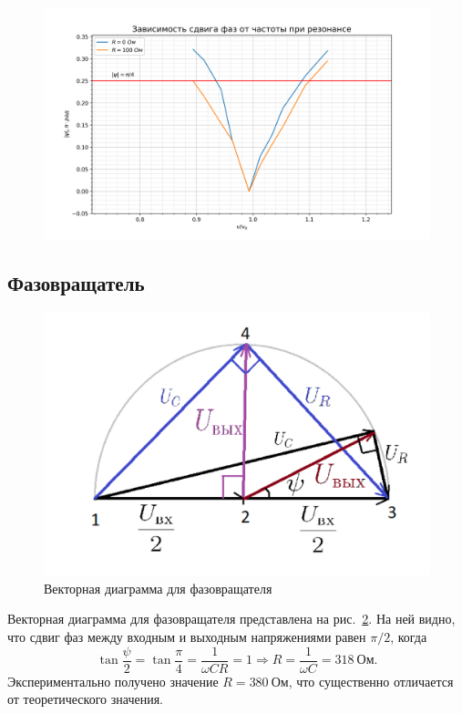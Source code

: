 \documentclass[a4paper, 12pt]{article}
\begin{document}
\begin{figure}[h!]
\begin{flushleft}
    \includegraphics[scale=0.7]{3.2.1_3.png}
\end{flushleft}
\caption{}
\label{ris3}
\end{figure}

\subsection{Фазовращатель}

\begin{figure}[h!]
\begin{center}
    \includegraphics[scale=1.5]{3.2.1_4.png}
\end{center}
\caption{Векторная диаграмма для фазовращателя}
\label{ris4}
\end{figure}

Векторная диаграмма для фазовращателя представлена на рис.~\ref{ris4}. На ней видно, что сдвиг фаз между входным и выходным напряжениями равен $\pi/2$, когда $$\tan{\frac{\psi}{2}} = \tan{\frac{\pi}{4}} = \frac{1}{\omega CR} = 1 \Rightarrow R = \frac{1}{\omega C} = 318~Ом.$$ Экспериментально получено значение $R = 380~Ом$, что существенно отличается от теоретического значения.
\end{document}

